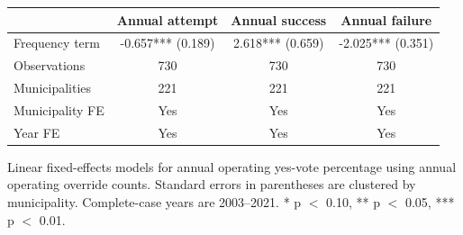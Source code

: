 \begin{center}
\scriptsize
\begin{tabular}{lccc}
\toprule
 & Annual attempt & Annual success & Annual failure \\
\midrule
Frequency term & -0.657*** (0.189) & 2.618*** (0.659) & -2.025*** (0.351) \\
Observations & 730 & 730 & 730 \\
Municipalities & 221 & 221 & 221 \\
Municipality FE & Yes & Yes & Yes \\
Year FE & Yes & Yes & Yes \\
\bottomrule
\end{tabular}
\vspace{0.05cm}
\parbox{0.94\textwidth}{\tiny Linear fixed-effects models for annual operating yes-vote percentage using annual operating override counts. Standard errors in parentheses are clustered by municipality. Complete-case years are 2003--2021. * p $<$ 0.10, ** p $<$ 0.05, *** p $<$ 0.01.}
\end{center}
